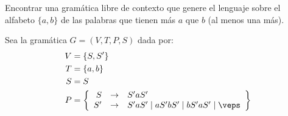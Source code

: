 \begin{ejercicio}\label{ej:1.1.5}
    Encontrar una gramática libre de contexto que genere el lenguaje sobre el alfabeto $\{a, b\}$ de las palabras que tienen más $a$ que $b$ (al menos una más).

    Sea la gramática $G=\left(V,T,P,S\right)$ dada por:
    \begin{align*}
        V &= \{S, S'\} \\
        T &= \{a,b\} \\
        S &= S \\
        P &= \left\{
            \begin{array}{rcl}
                S &\rightarrow & S'aS'\\
                S' &\rightarrow & S'aS' \mid aS'bS' \mid bS'aS' \mid \veps
            \end{array}
        \right\}
    \end{align*}
\begin{comment}

    Veamos ahora mediante doble inclusión que $$\cc{L}(G)=\{w\in \{a,b\}^\ast \mid N_a(w)>N_b(w)\}$$
    \begin{description}
        \item[$\subseteq)$] Sea $w\in \cc{L}(G)$. Entonces, tenemos en cuenta que todas las reglas de producción mantienen el balance entre $a$'s y $b$'s excepto:
        \begin{equation*}
            S \rightarrow S'aS'
            \qquad \text{y} \qquad
            S' \rightarrow S'aS'
        \end{equation*}
        En ambos casos, se añade un $a$ sin añadir un $b$, por lo que no puede darse que $N_a(w)<N_b(w)$. Tenemos por tanto que $N_a(w)\geq N_b(w)$ pero como inicialmente estamos forzados a usar $S\rightarrow S'aS'$, tenemos que $N_a(w)>N_b(w)$. Por tanto, $w\in \{w\in \{a,b\}^\ast \mid N_a(w)>N_b(w)\}$.

        \item[$\supseteq)$] Sea $w\in \{w\in \{a,b\}^\ast \mid N_a(w)>N_b(w)\}$. Entonces, 
    \end{description}
\end{comment}
\end{ejercicio}


